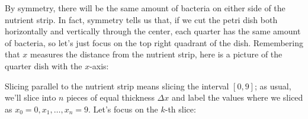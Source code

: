 \documentclass{article}
\begin{document}
\begin{enumerate}
\begin{enumerate}
\begin{enumerate}
      \begin{solution}
        By symmetry, there will be the same amount of bacteria on either
        side of the nutrient strip.  In fact, symmetry tells us that, if
        we cut the petri dish both horizontally and vertically through the
        center, each quarter has the same amount of bacteria, so let's
        just focus on the top right quadrant of the dish.  Remembering
        that $x$ measures the distance from the nutrient strip, here is a
        picture of the quarter dish with the $x$-axis:
        \begin{center}
        \end{center}
        Slicing parallel to the nutrient strip means slicing the interval
        $[0, 9]$; as usual, we'll slice into $n$ pieces of equal
        thickness $\Delta x$ and label the values where we sliced as $x_0
        = 0, x_1, \ldots, x_n = 9$.  Let's focus on the $k$-th slice:
        \begin{center}
\end{center}
\end{solution}
\end{enumerate}
\end{enumerate}
\end{enumerate}
\end{document}
